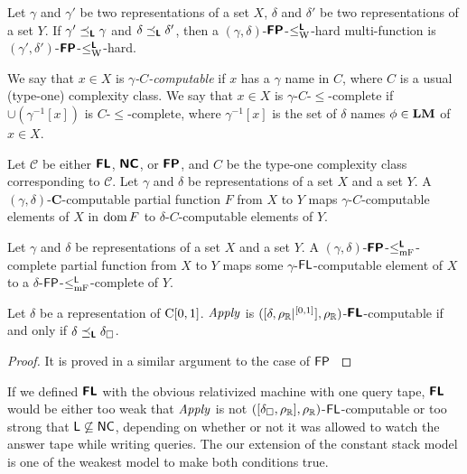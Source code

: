 \documentclass[envcountsame,orivec,oribibl]{llncs}
\begin{document}
\begin{lemma}
 Let $\gamma$ and $\gamma'$ be two representations of a set $X$, 
 $\delta$ and $\delta'$ be two representations of a set $Y$.
 If $\gamma' \preceq_{\text{\bfseries \sffamily \upshape L}} \gamma$ and $\delta \preceq_{\text{\bfseries \sffamily \upshape L}} \delta'$,
 then a $(\gamma, \delta)$-$\text{\bfseries \sffamily \upshape FP}$-$\leq _{\mathrm W} ^{\text{\bfseries \sffamily \upshape L}}$-hard multi-function is
 $(\gamma', \delta')$-$\text{\bfseries \sffamily \upshape FP}$-$\leq _{\mathrm W} ^{\text{\bfseries \sffamily \upshape L}}$-hard.
\end{lemma}

We say that $x \in X$ is \emph{$\gamma$-$C$-computable} if
$x$ has a $\gamma$ name in $C$,
where $C$ is a usual (type-one) complexity class.
We say that $x \in X$ is $\gamma$-$C$-$\le$-complete if
$\cup(\gamma^{-1}[x])$ is $C$-$\le$-complete,
where $\gamma^{-1}[x]$ is the set of $\delta$ names $\phi \in \mathbf{LM}$ of $x \in X$.



\begin{lemma}
 Let $\mathcal C$ be either $\text{\bfseries \sffamily \upshape FL}$, $\text{\bfseries \sffamily \upshape NC}$, 
 or $\text{\bfseries \sffamily \upshape FP}$, and $C$ be the type-one complexity class
 corresponding to $\mathcal C$.
 Let $\gamma$ and $\delta$ be representations of a set $X$ and a set $Y$.
 A $(\gamma, \delta)$-$\mathbf C$-computable partial function $F$ from $X$
 to $Y$ maps $\gamma$-$C$-computable elements of $X$
 in $\mathop{\rm dom} F$ to $\delta$-$C$-computable elements of $Y$.
\end{lemma}

\begin{lemma}
 \label{lemma:p-comp-maps-l-to-p-comp}
 Let $\gamma$ and $\delta$ be representations of a set $X$ and a set $Y$.
 A $(\gamma, \delta)$-$\text{\bfseries \sffamily \upshape FP}$-$\leq _{\mathrm{mF}} ^{\text{\bfseries \sffamily \upshape L}}$-complete partial function 
 from $X$ to $Y$ maps some $\gamma$-$\mathsf{FL}$-computable element of $X$
 to a $\delta$-$\mathsf{FP}$-$\leq _{\mathrm{mF}}^{\mathsf{L}}$-complete of $Y$.
\end{lemma}



\begin{theorem}
 \label{theorem:apply-is-L-computable}
 Let $\delta$ be a representation of $\mathrm C[0, 1]$.
 $\mathit{Apply}$ is $([\delta, \rho _\mathbb R|^{[0,1]}], \rho _\mathbb R)$-$\text{\bfseries \sffamily \upshape FL}$-computable if
 and only if $\delta \preceq_{\text{\bfseries \sffamily \upshape L}} \delta _\square$.
\end{theorem}

\begin{proof}
 It is proved in a similar argument to the case of $\mathsf{FP}$ \cite{kawamura11:_funct_space_repres_and_polyn_time_comput}
\end{proof}


If we defined $\text{\bfseries \sffamily \upshape FL}$ with the obvious relativized machine with one query tape,
$\text{\bfseries \sffamily \upshape FL}$ would be either too weak that $\mathit{Apply}$ is not $([\delta _\square,\rho _\mathbb R], \rho _\mathbb R)$-$\mathsf{FL}$-computable or
too strong that $\mathsf{L} \not \subseteq \mathsf{NC}$,
depending on whether or not it was allowed to watch the answer tape while writing queries.
The our extension of the constant stack model is one of the weakest model
to make both conditions true.
\end{document}

